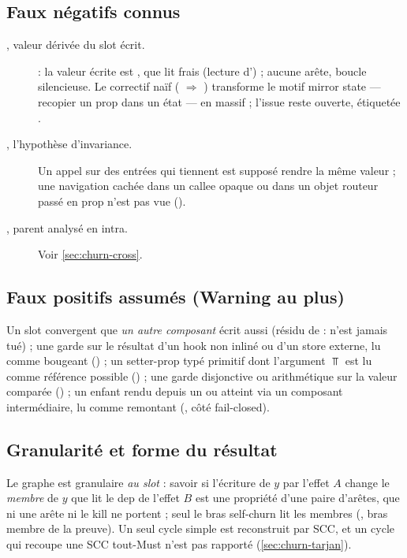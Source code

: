 \subsection{Faux négatifs connus}

\begin{description}
  \item[, valeur dérivée du slot écrit.]  : la valeur écrite est , que
         lit  frais (lecture d') ; aucune arête,
        boucle silencieuse. Le correctif naïf ( $\Rightarrow$ )
        transforme le motif \og mirror state\fg{} --- recopier un prop dans un état --- en
        \Warning{} massif ; l'issue reste ouverte, étiquetée .
  \item[, l'hypothèse d'invariance.] Un appel sur des entrées qui tiennent est
        supposé rendre la même valeur ; une navigation cachée dans un callee opaque ou dans
        un objet routeur passé en prop n'est pas vue ().
  \item[, parent analysé en intra.] Voir \cref{sec:churn-cross}.
\end{description}

\subsection{Faux positifs assumés (Warning au plus)}

Un slot convergent que \emph{un autre composant} écrit aussi (résidu de  :
 n'est jamais tué) ; une garde sur le résultat d'un hook non inliné ou d'un
store externe, lu comme bougeant () ; un setter-prop typé primitif dont
l'argument $\Top$ est lu comme référence possible () ; une garde disjonctive ou
arithmétique sur la valeur comparée () ; un enfant rendu depuis un  ou
atteint via un composant intermédiaire, lu comme remontant (, côté fail-closed).

\subsection{Granularité et forme du résultat}

Le graphe est granulaire \emph{au slot} : savoir si l'écriture de $y$ par l'effet $A$ change
le \emph{membre} de $y$ que lit le dep de l'effet $B$ est une propriété d'une paire
d'arêtes, que ni une arête ni le kill ne portent ; seul le bras self-churn lit les membres
(, bras membre de la preuve). Un seul cycle simple est reconstruit par
SCC, et un cycle  qui recoupe une SCC tout-Must n'est pas rapporté
(\cref{sec:churn-tarjan}).

